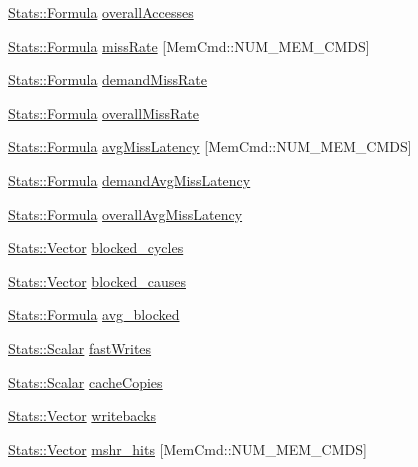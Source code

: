 \begin{DoxyCompactItemize}
\item 
\hyperlink{classStats_1_1Formula}{Stats::Formula} \hyperlink{group__CacheStatistics_ga84cca53e5e12d55fe025a3a22bd77a28}{overallAccesses}
\item 
\hyperlink{classStats_1_1Formula}{Stats::Formula} \hyperlink{group__CacheStatistics_gabe84abb4bee43d594923487ba5e013c1}{missRate} \mbox{[}MemCmd::NUM\_\-MEM\_\-CMDS\mbox{]}
\item 
\hyperlink{classStats_1_1Formula}{Stats::Formula} \hyperlink{group__CacheStatistics_ga58de8cb7b3151d13ca30115eee7cd475}{demandMissRate}
\item 
\hyperlink{classStats_1_1Formula}{Stats::Formula} \hyperlink{group__CacheStatistics_ga61b6b530510b172ca4c2774dd939debf}{overallMissRate}
\item 
\hyperlink{classStats_1_1Formula}{Stats::Formula} \hyperlink{group__CacheStatistics_ga964a436d0a0ae4006fe5a8b418058e44}{avgMissLatency} \mbox{[}MemCmd::NUM\_\-MEM\_\-CMDS\mbox{]}
\item 
\hyperlink{classStats_1_1Formula}{Stats::Formula} \hyperlink{group__CacheStatistics_ga4a5f08d40501e08ed841c65206fc7757}{demandAvgMissLatency}
\item 
\hyperlink{classStats_1_1Formula}{Stats::Formula} \hyperlink{group__CacheStatistics_ga1246f7d24c92b2c043128804bb772c53}{overallAvgMissLatency}
\item 
\hyperlink{classStats_1_1Vector}{Stats::Vector} \hyperlink{group__CacheStatistics_ga4acd5af734aeaacf375fb724164623a2}{blocked\_\-cycles}
\item 
\hyperlink{classStats_1_1Vector}{Stats::Vector} \hyperlink{group__CacheStatistics_ga7868c651a1ef44806d546d9a018835cc}{blocked\_\-causes}
\item 
\hyperlink{classStats_1_1Formula}{Stats::Formula} \hyperlink{group__CacheStatistics_ga61f8d4c8d21aa6b9347cb04bd401d05f}{avg\_\-blocked}
\item 
\hyperlink{classStats_1_1Scalar}{Stats::Scalar} \hyperlink{group__CacheStatistics_gaaa4a7e9f5dcb48cc5a53ac2335e934b3}{fastWrites}
\item 
\hyperlink{classStats_1_1Scalar}{Stats::Scalar} \hyperlink{group__CacheStatistics_ga733d9eeafaa8c6f179cf5ed460e36ce0}{cacheCopies}
\item 
\hyperlink{classStats_1_1Vector}{Stats::Vector} \hyperlink{group__CacheStatistics_gace2b37e760e47862f243e4b03c05ef5e}{writebacks}
\item 
\hyperlink{classStats_1_1Vector}{Stats::Vector} \hyperlink{group__CacheStatistics_ga92faf658f75559bd75a8839d4de1f8a9}{mshr\_\-hits} \mbox{[}MemCmd::NUM\_\-MEM\_\-CMDS\mbox{]}

\end{DoxyCompactItemize}
